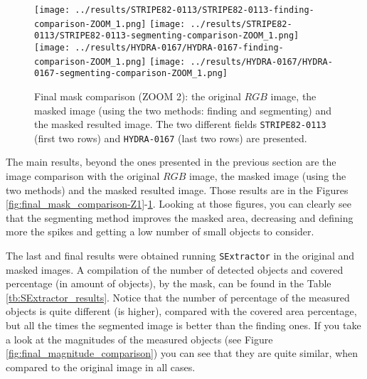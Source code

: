 \documentclass{article}
\begin{document}
\begin{figure}[h!]
  \centering
  \texttt{[image: ../results/STRIPE82-0113/STRIPE82-0113-finding-comparison-ZOOM\_1.png]}
  \texttt{[image: ../results/STRIPE82-0113/STRIPE82-0113-segmenting-comparison-ZOOM\_1.png]}
  \texttt{[image: ../results/HYDRA-0167/HYDRA-0167-finding-comparison-ZOOM\_1.png]}
  \texttt{[image: ../results/HYDRA-0167/HYDRA-0167-segmenting-comparison-ZOOM\_1.png]}
  \caption{Final mask comparison (ZOOM 2): the original $RGB$ image, the masked image (using the two methods: finding and segmenting) and the masked resulted image. The two different fields \texttt{STRIPE82-0113} (first two rows) and \texttt{HYDRA-0167} (last two rows) are presented.}
  \label{fig:final_mask_comparison-Z2}
\end{figure}

The main results, beyond the ones presented in the previous section are the image comparison with the original $RGB$ image, the masked image (using the two methods) and the masked resulted image. Those results are in the Figures \ref{fig:final_mask_comparison-Z1}-\ref{fig:final_mask_comparison-Z2}. Looking at those figures, you can clearly see that the segmenting method improves the masked area, decreasing and defining more the spikes and getting a low number of small objects to consider.

The last and final results were obtained running \texttt{SExtractor} in the original and masked images. A compilation of the number of detected objects and covered percentage (in amount of objects), by the mask, can be found in the Table \ref{tb:SExtractor_results}. Notice that the number of percentage of the measured objects is quite different (is higher), compared with the covered area percentage, but all the times the segmented image is better than the finding ones. If you take a look at the magnitudes of the measured objects (see Figure \ref{fig:final_magnitude_comparison}) you can see that they are quite similar, when compared to the original image in all cases. 
\end{document}
